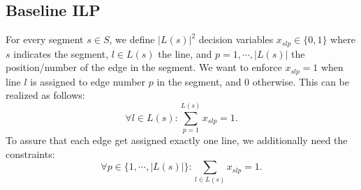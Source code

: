 \documentclass{llncs}
\begin{document}
\subsection{Baseline ILP}\label{SEC:baseline}
%
For every segment $s \in S$, we define $|L(s)|^{2}$ decision variables $x_{slp} \in \{0,1\}$ where $s$ indicates the segment, $l \in L(s)$ the line, and $p=1, \cdots, |L(s)|$ the position/number of the edge in the segment. We want to enforce $x_{slp}=1$ when line $l$ is assigned to edge number $p$ in the segment, and $0$ otherwise. This can be realized as follows:
\begin{equation*}
\forall l \in L(s): \sum_{p=1}^{L(s)} x_{slp}=1.
\end{equation*}
To assure that each edge get assigned exactly one line, we additionally need the constraints:
\begin{equation*}
	\forall p \in  \{1,\cdots,|L(s)|\} : \sum_{l \in L(s)} x_{slp} = 1.
\end{equation*}
\end{document}
